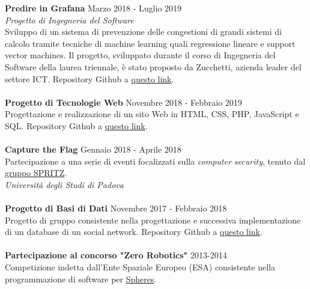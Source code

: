 \documentclass[margin, 10pt]{res}
\begin{document}
\begin{resume}
\textbf{Predire in Grafana} \hfill Marzo 2018 - Luglio 2019 \\
\textit{Progetto di Ingegneria del Software} \\
Sviluppo di un sistema di prevenzione delle congestioni di grandi sistemi di calcolo tramite tecniche di machine learning quali regressione lineare e support vector machines. Il progetto, sviluppato durante il corso di Ingegneria del Software della laurea triennale, è stato proposto da Zucchetti, azienda leader del settore ICT. Repository Github a \href{https://github.com/CoffeeCodeSWE/swe-predire-in-grafana}{questo link}. \\ \\
\textbf{Progetto di Tecnologie Web} \hfill Novembre 2018 - Febbraio 2019 \\
Progettazione e realizzazione di un sito Web in HTML, CSS, PHP, JavaScript e SQL. Repository Github a \href{https://github.com/enricobu96/TecWebUNIPD}{questo link}. \\ \\
\textbf{Capture the Flag} \hfill Gennaio 2018 - Aprile 2018 \\
Partecipazione a una serie di eventi focalizzati sulla \textit{computer security}, tenuto dal \href{https://spritz.math.unipd.it/}{gruppo SPRITZ}. \\
\textit{Università degli Studi di Padova} \\ \\
\textbf{Progetto di Basi di Dati} \hfill Novembre 2017 - Febbraio 2018 \\
Progetto di gruppo consistente nella progettazione e successiva implementazione di un database di un social network. Repository Github a \href{https://github.com/enricobu96/DB1718}{questo link}. \\ \\
\textbf{Partecipazione al concorso "Zero Robotics"} \hfill 2013-2014 \\
Competizione indetta dall'Ente Spaziale Europeo (ESA) consistente nella programmazione di software per \href{https://www.esa.int/Science_Exploration/Human_and_Robotic_Exploration/Education/Robot_Spheres_in_zero-gravity_action}{Spheres}.



\end{resume}
\end{document}
